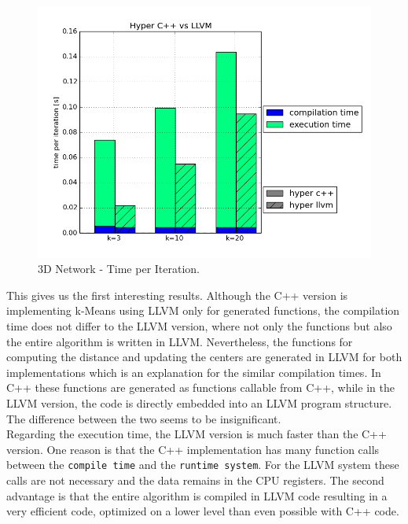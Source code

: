 \begin{figure}[htsb]
  \centering
  \includegraphics[scale=0.4, trim="0cm 1.5cm 0cm 0cm"]{figures/charts/hyper_network}
  \caption[3D Network - Time per Iteration]{3D Network - Time per Iteration.}
  \label{fig:hyper_network}
\end{figure}

This gives us the first interesting results. Although the C++ version is implementing k-Means using LLVM only for generated functions, the compilation time does not differ to the LLVM version, where not only the functions but also the entire algorithm is written in LLVM. Nevertheless, the functions for computing the distance and updating the centers are generated in LLVM for both implementations which is an explanation for the similar compilation times. In C++ these functions are generated as functions callable from C++, while in the LLVM version, the code is directly embedded into an LLVM program structure. The difference between the two seems to be insignificant.
\\
Regarding the execution time, the LLVM version is much faster than the C++ version. One reason is that the C++ implementation has many function calls between the \texttt{compile time} and the \texttt{runtime system}. For the LLVM system these calls are not necessary and the data remains in the CPU registers. The second advantage is that the entire algorithm is compiled in LLVM code resulting in a very efficient code, optimized on a lower level than even possible with C++ code.


